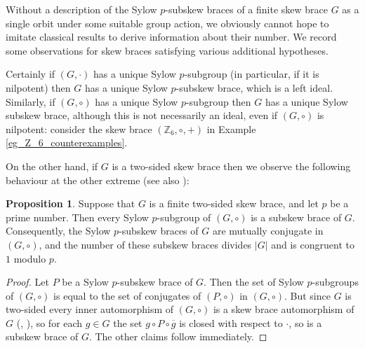 \documentclass[12pt,a4paper, reqno]{amsart}
\theoremstyle{definition}
\newtheorem{proposition}[theorem]{Proposition}
\newcommand{\Z}{\mathbb{Z}}
\renewcommand{\bar}{\overline}
\begin{document}

Without a description of the Sylow $p$-subskew braces of a finite skew brace $G$ as a single orbit under some suitable group action, we obviously cannot hope to imitate classical results to derive information about their number. We record some observations for skew braces satisfying various additional hypotheses.

Certainly if $ (G,\cdot) $ has a unique Sylow $ p $-subgroup (in particular, if it is nilpotent) then $ G $ has a unique Sylow $ p $-subskew brace, which is a left ideal. Similarly, if $ (G,\circ) $ has a unique Sylow $ p $-subgroup then $ G $ has a unique Sylow subskew brace, although this is not necessarily an ideal, even if $ (G,\circ) $ is nilpotent: consider the skew brace $ (\Z_{6},\circ,+) $ in Example \ref{eg_Z_6_counterexamples}.

On the other hand, if $ G $ is a two-sided skew brace then we observe the following behaviour at the other extreme (see also \cite[Theorem 14]{CCMFT25}):

\begin{proposition}
Suppose that $ G $ is a finite two-sided skew brace, and let $ p $ be a prime number. Then every Sylow $ p $-subgroup of $ (G,\circ) $ is a subskew brace of $ G $. Consequently, the Sylow $ p $-subskew braces of $ G $ are mutually conjugate in $ (G,\circ) $, and the number of these subskew braces divides $ |G| $ and is congruent to $ 1 $ modulo $ p $. 
\end{proposition}
\begin{proof}
Let $ P $ be a Sylow $ p $-subskew brace of $ G $. Then the set of Sylow $ p $-subgroups of $ (G,\circ) $ is equal to the set of conjugates of $ (P,\circ) $ in $ (G,\circ) $. But since $ G $ is two-sided every inner automorphism of $ (G,\circ) $ is a skew brace automorphism of $ G $ (\cite[Lemma 4.1]{Na19},  \cite[Proposition 2.3]{Tra23}), so for each $ g \in G $ the set $ g \circ P \circ \bar{g} $ is closed with respect to $ \cdot $, so is a subskew brace of $ G $. The other claims follow immediately. 
\end{proof}
\end{document}
